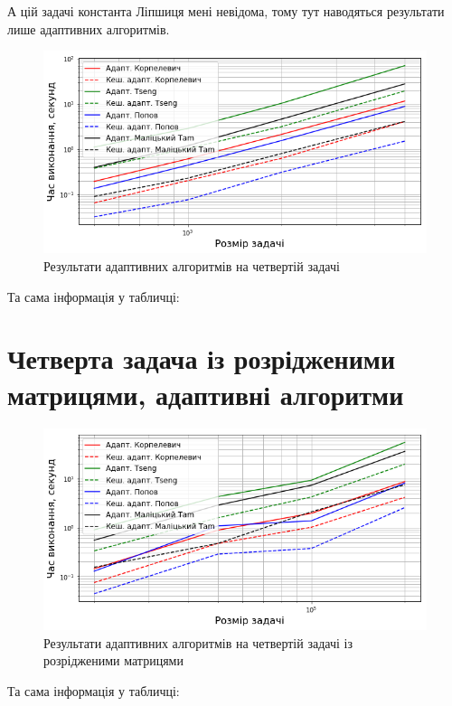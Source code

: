 А цій задачі константа Ліпшиця мені невідома, тому тут наводяться результати лише адаптивних алгоритмів.

\begin{figure}[H]
    \centering
    \includegraphics[width=\textwidth]{img/4/adapt/time.png}
    \caption{Результати адаптивних алгоритмів на четвертій задачі}
\end{figure}

Та сама інформація у табличці:





\section{Четверта задача  із розрідженими матрицями, адаптивні алгоритми}

\begin{figure}[H]
    \centering
    \includegraphics[width=\textwidth]{img/4/sparse/adapt/time.png}
    \caption{Результати адаптивних алгоритмів на четвертій задачі із розрідженими матрицями}
\end{figure}

Та сама інформація у табличці:




